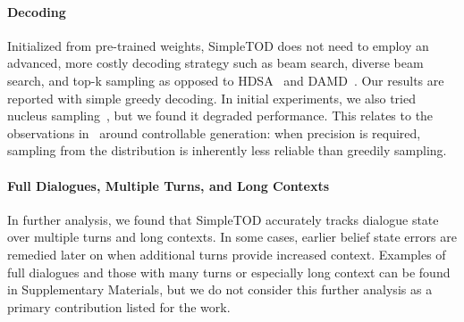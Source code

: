 \documentclass{article}
\begin{document}
\paragraph{Decoding}
Initialized from pre-trained weights, 
SimpleTOD does not need to employ an advanced, more costly decoding strategy such as beam search, diverse beam search, and top-k sampling as opposed to HDSA~\cite{HDSA2019chen} and DAMD~\cite{DAMD2019zhang}.
Our results are reported with simple greedy decoding.
In initial experiments,
we also tried nucleus sampling~\citep{holtzman2019curious}, 
but we found it degraded performance.
This relates to the observations in~\citet{keskar2019ctrl} around controllable generation: when precision is required, sampling from the distribution is inherently less reliable than greedily sampling.

\paragraph{Full Dialogues, Multiple Turns, and Long Contexts} In further analysis, we found that SimpleTOD accurately tracks dialogue state over multiple turns and long contexts. 
In some cases, earlier belief state errors are remedied later on when additional turns provide increased context.
Examples of full dialogues and those with many turns or especially long context can be found in Supplementary Materials, but we do not consider this further analysis as a primary contribution listed for the work.
\end{document}
